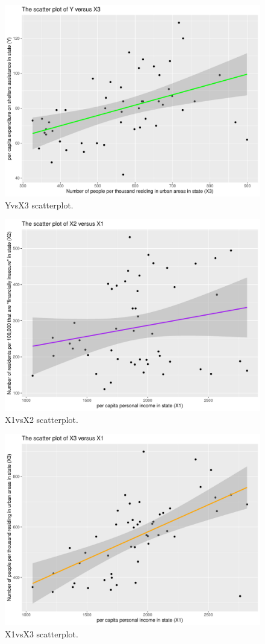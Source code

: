 \documentclass[12pt,letterpaper]{article}
\begin{document}
\begin{itemize}
\begin{figure}[h!]
\end{figure}
\begin{figure}[h!]\centering
	\caption{\footnotesize YvsX3 scatterplot.}
	\label{fig:plot_1Y_vs_X3}
	\includegraphics[width=.75\textwidth]{Y_vs_X3_scatterplot.pdf}
\end{figure}
\begin{figure}[h!]\centering
	\caption{\footnotesize X1vsX2 scatterplot.}
	\label{fig:plot_X1_vs_X2}
	\includegraphics[width=.75\textwidth]{X1_vs_X2_scatterplot.pdf}
\end{figure}
\begin{figure}[h!]\centering
	\caption{\footnotesize X1vsX3 scatterplot.}
	\label{fig:plot_X1_vs_X3}
	\includegraphics[width=.75\textwidth]{X1_vs_X3_scatterplot.pdf}

\end{figure}
\end{itemize}
\end{document}
